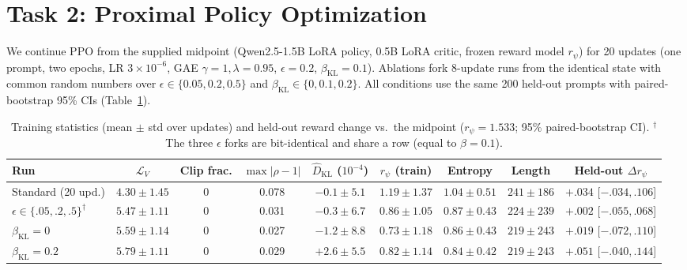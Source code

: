 \section{Task 2: Proximal Policy Optimization}
\label{sec:ppo}
We continue PPO from the supplied midpoint (Qwen2.5-1.5B LoRA policy, 0.5B LoRA critic, frozen reward model $r_\psi$) for 20 updates (one prompt, two epochs, LR $3{\times}10^{-6}$, GAE $\gamma{=}1,\lambda{=}0.95$, $\epsilon{=}0.2$, $\beta_{\text{KL}}{=}0.1$). Ablations fork 8-update runs from the identical state with common random numbers over $\epsilon\in\{0.05,0.2,0.5\}$ and $\beta_{\text{KL}}\in\{0,0.1,0.2\}$. All conditions use the same 200 held-out prompts with paired-bootstrap 95\% CIs (Table~\ref{tab:ppo}).

\begin{table}[h]
\centering\small
\caption{Training statistics (mean $\pm$ std over updates) and held-out reward change vs.\ the midpoint ($r_\psi{=}1.533$; 95\% paired-bootstrap CI). $^\dagger$The three $\epsilon$ forks are bit-identical and share a row (equal to $\beta{=}0.1$).}
\label{tab:ppo}
\setlength{\tabcolsep}{2.4pt}
\begin{tabular}{@{}lcccccccc@{}}
\toprule
Run & $\mathcal{L}_V$ & Clip frac. & $\max|\rho{-}1|$ & $\hat D_{\text{KL}}$ ($10^{-4}$) & $r_\psi$ (train) & Entropy & Length & Held-out $\Delta r_\psi$ \\
\midrule
Standard (20 upd.) & $4.30\pm1.45$ & 0 & 0.078 & $-0.1\pm5.1$ & $1.19\pm1.37$ & $1.04\pm0.51$ & $241\pm186$ & $+.034$ [$-.034,.106$] \\
$\epsilon\in\{.05,.2,.5\}^\dagger$ & $5.47\pm1.11$ & 0 & 0.031 & $-0.3\pm6.7$ & $0.86\pm1.05$ & $0.87\pm0.43$ & $224\pm239$ & $+.002$ [$-.055,.068$] \\
$\beta_{\text{KL}}=0$ & $5.59\pm1.14$ & 0 & 0.027 & $-1.2\pm8.8$ & $0.73\pm1.18$ & $0.86\pm0.43$ & $219\pm243$ & $+.019$ [$-.072,.110$] \\
$\beta_{\text{KL}}=0.2$ & $5.79\pm1.11$ & 0 & 0.029 & $+2.6\pm5.5$ & $0.82\pm1.14$ & $0.84\pm0.42$ & $219\pm243$ & $+.051$ [$-.040,.144$] \\
\bottomrule
\end{tabular}
\end{table}


